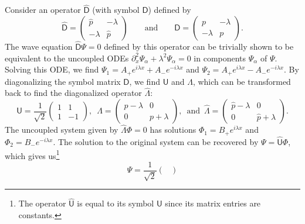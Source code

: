 \begin{example}
Consider an operator $\widehat{\mathsf{D}}$ (with symbol $\mathsf{D}$) defined by
%
\begin{equation}
  \widehat{\mathsf{D}} =
  \begin{pmatrix}
    \hat{p} & -\lambda\\
    -\lambda & \hat{p}
  \end{pmatrix}
  \qquad\text{and}\qquad
  \mathsf{D} =
  \begin{pmatrix}
    p & -\lambda\\
    -\lambda & p
  \end{pmatrix}.
\end{equation}
%
The wave equation $\widehat{\mathsf{D}}\Psi = 0$ defined by this operator can be trivially shown to be equivalent to the uncoupled ODEs $\partial_{x}^{2}\Psi_{\alpha} + \lambda^{2}\Psi_{\alpha} = 0$ in components $\Psi_{\alpha}$ of $\Psi$.
Solving this ODE, we find $\Psi_{1} = A_{+}e^{i \lambda x} + A_{-}e^{-i\lambda x}$ and $\Psi_{2} = A_{+}e^{i \lambda x} - A_{-}e^{-i\lambda x}$.
%
By diagonalizing the symbol matrix $\mathsf{D}$, we find $\mathsf{U}$ and $\Lambda$, which can be transformed back to find the diagonalized operator $\hat{\Lambda}$:
%
\begin{equation}
  \mathsf{U} = \frac{1}{\sqrt{2}}
  \begin{pmatrix}
    1 & 1\\
    1 & -1
  \end{pmatrix},\enspace
  \Lambda =
  \begin{pmatrix}
    p - \lambda & 0\\
    0 & p + \lambda
  \end{pmatrix},\enspace
  \text{and}\enspace
  \hat{\Lambda} =
  \begin{pmatrix}
    \hat{p} - \lambda & 0\\
    0 & \hat{p} + \lambda
  \end{pmatrix}.
\end{equation}
%
The uncoupled system given by $\hat{\Lambda}\Phi = 0 $ has solutions $\Phi_{1} = B_{+}e^{i\lambda x}$ and $\Phi_{2} = B_{-}e^{-i\lambda x}$.
The solution to the original system can be recovered by $\Psi = \widehat{\mathsf{U}}\Phi$, which gives us\footnote{The operator $\widehat{\mathsf{U}}$ is equal to its symbol $\mathsf{U}$ since its matrix entries are constants.}
%
\begin{equation}
  \Psi = \frac{1}{\sqrt{2}}
  \begin{pmatrix}

\end{pmatrix}
\end{equation}
\end{example}
